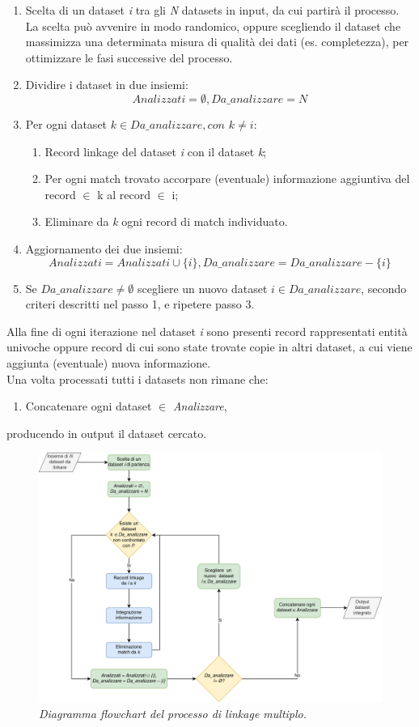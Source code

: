 \documentclass[a4paper,12pt]{article}
\begin{document}
\begin{enumerate}
	\item Scelta di un dataset \textit{i} tra gli \textit{N} datasets in input, da cui partirà il processo. La scelta può avvenire in modo randomico, oppure scegliendo il dataset che massimizza una determinata misura di qualità dei dati (es. completezza), per ottimizzare le fasi successive del processo.
	\item Dividire i dataset in due insiemi: \[Analizzati = \emptyset, Da\_analizzare = N\]
	\item Per ogni dataset \textit{$k \in Da\_analizzare, con$ $k \neq i$}:
	\begin{enumerate}
		\item Record linkage del dataset \textit{i} con il dataset \textit{k};
		\item Per ogni match trovato accorpare (eventuale) informazione aggiuntiva del record $\in$ k al record $\in$ i;
		\item Eliminare da \textit{k} ogni record di match individuato.
	\end{enumerate}
	\item Aggiornamento dei due insiemi: \[Analizzati = Analizzati \cup \{i\}, Da\_analizzare = Da\_analizzare - \{i\}\]
	\item Se \(Da\_analizzare \neq \emptyset\) scegliere un nuovo dataset \(i \in Da\_analizzare\), secondo criteri descritti nel passo 1, e ripetere passo 3.
\end{enumerate}
Alla fine di ogni iterazione nel dataset \textit{i} sono presenti record rappresentati entità univoche oppure record di cui sono state trovate copie in altri dataset, a cui viene aggiunta (eventuale) nuova informazione.\\Una volta processati tutti i datasets non rimane che:
\begin{enumerate}[resume]
	\item Concatenare ogni dataset $\in$ \textit{Analizzare},
\end{enumerate}
producendo in output il dataset cercato.\\
\begin{figure}[H]
	\centering
	\includegraphics[width=0.8\linewidth]{img/Method2Flowchart.png}
	\caption{\textit{Diagramma flowchart del processo di linkage multiplo.}}
\end{figure}
\newpage
\end{document}
